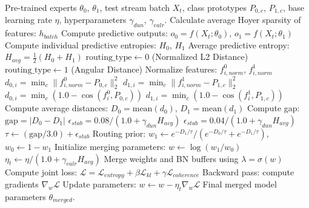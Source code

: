 \documentclass{article}
\theoremstyle{plain}
\theoremstyle{definition}
\theoremstyle{remark}
\begin{document}
\begin{algorithm}[tb]
\caption{Adaptive Hybrid Routing with DUN and EALR}
\label{alg:ahr_sats_dun}
\begin{algorithmic}[1]
 Pre-trained experts $\theta_0$, $\theta_1$, test stream batch $X_t$, class prototypes $P_{0, c}$, $P_{1, c}$, base learning rate $\eta$, hyperparameters $\gamma_{dun}$, $\gamma_{ealr}$.
\STATE Calculate average Hoyer sparsity of features: $h_{batch}$
\STATE Compute predictive outputs: $o_0 = f(X_t; \theta_0)$, $o_1 = f(X_t; \theta_1)$
\STATE Compute individual predictive entropies: $H_0$, $H_1$
\STATE Average predictive entropy: $H_{avg} = \frac{1}{2}(H_0 + H_1)$
    \STATE $\text{routing\_type} \leftarrow 0$ (Normalized L2 Distance)
\ELSE
    \STATE $\text{routing\_type} \leftarrow 1$ (Angular Distance)
\ENDIF
{}
        \STATE Normalize features: $f^0_{i, norm}$, $f^1_{i, norm}$
        \STATE $d_{0, i} = \min_{c} \|f^0_{i, norm} - P_{0, c}\|_2^2$
        \STATE $d_{1, i} = \min_{c} \|f^1_{i, norm} - P_{1, c}\|_2^2$
    \ELSE
        \STATE $d_{0, i} = \min_{c} (1.0 - \cos(f^0_i, P_{0, c}))$
        \STATE $d_{1, i} = \min_{c} (1.0 - \cos(f^1_i, P_{1, c}))$
    \ENDIF
\ENDFOR
\STATE Compute average distances: $D_0 = \text{mean}(d_0)$, $D_1 = \text{mean}(d_1)$
\STATE Compute gap: $\text{gap} = |D_0 - D_1|$
    \STATE $\epsilon_{stab} = 0.08 / (1.0 + \gamma_{dun} H_{avg})$
\ELSE
    \STATE $\epsilon_{stab} = 0.04 / (1.0 + \gamma_{dun} H_{avg})$
\ENDIF
\STATE $\tau \leftarrow (\text{gap}/3.0) + \epsilon_{stab}$
\STATE Routing prior: $w_1 \leftarrow e^{-D_1/\tau} / (e^{-D_0/\tau} + e^{-D_1/\tau})$, $w_0 \leftarrow 1 - w_1$
\STATE Initialize merging parameters: $w \leftarrow \log(w_1 / w_0)$
 $\eta_t \leftarrow \eta / (1.0 + \gamma_{ealr} H_{avg})$
    \STATE Merge weights and BN buffers using $\lambda = \sigma(w)$
    \STATE Compute joint loss: $\mathcal{L} = \mathcal{L}_{entropy} + \beta \mathcal{L}_{kl} + \gamma \mathcal{L}_{coherence}$
    \STATE Backward pass: compute gradients $\nabla_w \mathcal{L}$
    \STATE Update parameters: $w \leftarrow w - \eta_t \nabla_w \mathcal{L}$
\ENDFOR
{} Final merged model parameters $\theta_{merged}$.
\end{algorithmic}
\end{algorithm}
\end{document}
